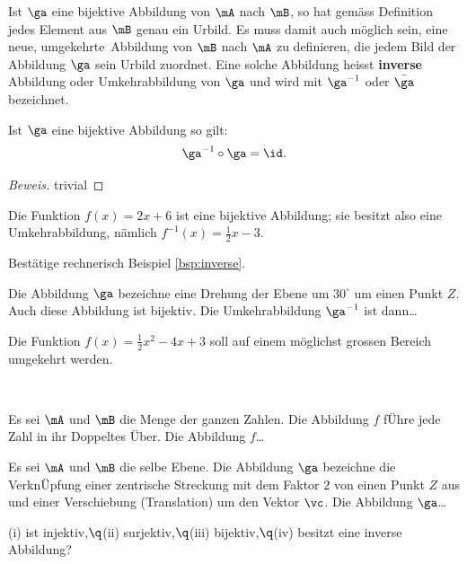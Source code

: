\documentclass[%
11pt,%
twoside,%
titlepage,%
german,%
headsepline%
]{scrartcl}
\begin{document}
Ist $\ga$ eine bijektive Abbildung von $\mA$ nach $\mB$, so hat gemäss Definition jedes Element aus $\mB$ genau ein Urbild. Es muss damit auch möglich sein, eine neue, \glqq umgekehrte\grqq\ Abbildung von $\mB$ nach $\mA$ zu definieren, die jedem Bild der Abbildung $\ga$ sein Urbild zuordnet. Eine solche Abbildung heisst \textbf{inverse} Abbildung oder Umkehrabbildung von $\ga$ und wird mit $\ga^{-1}$ oder $\bar{\ga}$ bezeichnet.

\begin{satz}
Ist $\ga$ eine bijektive Abbildung so gilt:
$$\ga^{-1}\circ\ga=\id.$$
\end{satz}

\begin{proof}[Beweis]
trivial
\end{proof}

\begin{bsp}
\label{bsp:inverse}
Die Funktion $f(x) = 2x + 6$ ist eine bijektive Abbildung; sie besitzt also eine
Umkehrabbildung, nämlich $f^{-1}(x)=\frac{1}{2}x-3$.
\end{bsp}

\begin{ueb}
Bestätige rechnerisch Beispiel \ref{bsp:inverse}.
\end{ueb}

\begin{ueb}
Die Abbildung $\ga$ bezeichne eine Drehung der Ebene um $30^\circ$ um einen Punkt $Z$. Auch diese Abbildung ist bijektiv. Die Umkehrabbildung $\ga^{-1}$ ist dann\dots
\end{ueb}

\begin{ueb}
Die Funktion $f(x) = \frac{1}{2}x^2-4x+3$ soll auf einem möglichst grossen Bereich umgekehrt werden.
\end{ueb}

\begin{ueb}\label{uebinjsurbij}
\ \\[-4ex]
\begin{enumeratea}
\item Es sei $\mA$ und $\mB$ die Menge der ganzen Zahlen. Die Abbildung $f$ f\"Uhre jede Zahl in ihr Doppeltes \"Uber. Die Abbildung $f$\dots
\item Es sei $\mA$ und $\mB$ die selbe Ebene. Die Abbildung $\ga$ bezeichne die Verkn\"Upfung einer zentrische Streckung mit dem Faktor $2$ von einen Punkt $Z$ aus und einer Verschiebung (Translation) um den Vektor $\vc$. Die Abbildung $\ga$\dots

(i) ist injektiv,$\q$(ii) surjektiv,$\q$(iii) bijektiv,$\q$(iv) besitzt eine inverse Abbildung?
\end{enumeratea}
\end{ueb}
\end{document}
